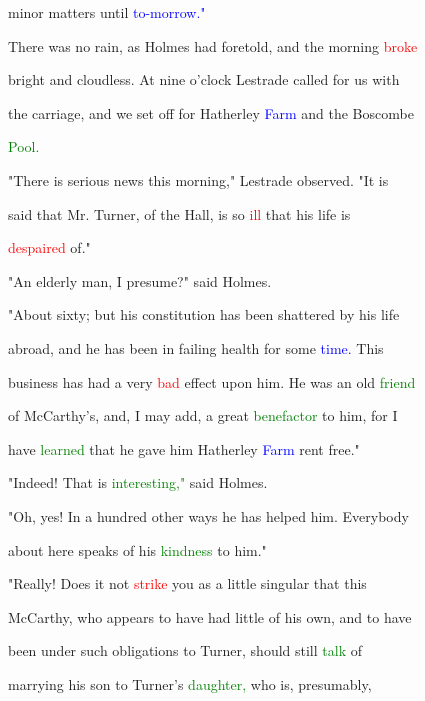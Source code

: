  minor matters until \textcolor{blue}{to-morrow."}



 There was no rain, as Holmes had foretold, and the morning \textcolor{red}{broke}

 bright and cloudless. At nine o'clock Lestrade called for us with

 the carriage, and we set off for Hatherley \textcolor{blue}{Farm} and the Boscombe

 \textcolor{green}{Pool.}



 "There is serious news this morning," Lestrade observed. "It is

 said that Mr. Turner, of the Hall, is so \textcolor{red}{ill} that his life is

 \textcolor{red}{despaired} of."



 "An elderly man, I presume?" said Holmes.



 "About sixty; but his constitution has been \textcolor{BurntOrange}{shattered} by his life

 abroad, and he has been in failing health for some \textcolor{blue}{time.} This

 business has had a very \textcolor{red}{bad} effect upon him. He was an old \textcolor{green}{friend}

 of McCarthy's, and, I may add, a great \textcolor{green}{benefactor} to him, for I

 have \textcolor{green}{learned} that he gave him Hatherley \textcolor{blue}{Farm} rent free."



 "Indeed! That is \textcolor{green}{interesting,"} said Holmes.



 "Oh, yes! In a hundred other ways he has helped him. Everybody

 about here speaks of his \textcolor{green}{kindness} to him."



 "Really! Does it not \textcolor{red}{strike} you as a little singular that this

 McCarthy, who appears to have had little of his own, and to have

 been under such obligations to Turner, should still \textcolor{green}{talk} of

 \textcolor{BurntOrange}{marrying} his son to Turner's \textcolor{green}{daughter,} who is, presumably,

